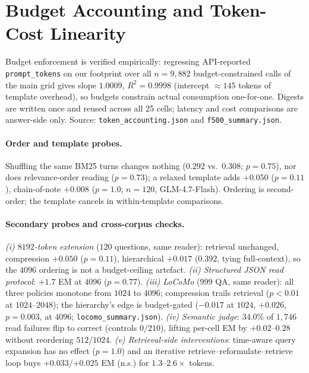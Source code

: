 \documentclass{article} %
\begin{document}
\section{Budget Accounting and Token-Cost Linearity}
\label{app:budget}
Budget enforcement is verified empirically: regressing API-reported \texttt{prompt\_tokens}
on our footprint over all $n{=}9{,}882$ budget-constrained calls of the main grid gives slope
$1.0009$, $R^2{=}0.9998$ (intercept $\approx 145$ tokens of template overhead), so budgets
constrain actual consumption one-for-one. Digests are written once and reused across all 25 cells; latency and cost comparisons are answer-side only. Source:
\texttt{token\_accounting.json} and \texttt{f500\_summary.json}.
\paragraph{Order and template probes.}
\label{app:rebuttal}
Shuffling the same BM25 turns changes nothing ($0.292$ vs.\ $0.308$; $p{=}0.75$), nor does
relevance-order reading ($p{=}0.73$); a relaxed template adds $+0.050$ ($p{=}0.11$),
chain-of-note $+0.008$ ($p{=}1.0$; $n{=}120$, GLM-4.7-Flash). Ordering is second-order; the
template cancels in within-template comparisons.

\paragraph{Secondary probes and cross-corpus checks.}
\label{app:full500}

\emph{(i) $8192$-token extension} ($120$ questions, same reader): retrieval unchanged,
compression $+0.050$ ($p{=}0.11$), hierarchical $+0.017$ ($0.392$, tying full-context), so the
$4096$ ordering is not a budget-ceiling artefact. \emph{(ii) Structured JSON read protocol}:
$+1.7$ EM at $4096$ ($p{=}0.77$). \emph{(iii) LoCoMo} ($999$ QA, same reader): all three
policies monotone from $1024$ to $4096$; compression trails retrieval ($p{<}0.01$ at
$1024$--$2048$); the hierarchy's edge is budget-gated ($-0.017$ at $1024$, $+0.026$,
$p{=}0.003$, at $4096$; \texttt{locomo\_summary.json}). \emph{(iv) Semantic judge}: $34.0\%$
of $1{,}746$ read failures flip to correct (controls $0/210$), lifting per-cell EM by
$+0.02$--$0.28$ without reordering $512$/$1024$. \emph{(v) Retrieval-side interventions}:
time-aware query expansion has no effect ($p{=}1.0$) and an iterative
retrieve--reformulate--retrieve loop buys $+0.033$/$+0.025$ EM (n.s.) for $1.3$--$2.6\times$
tokens.
\end{document}
